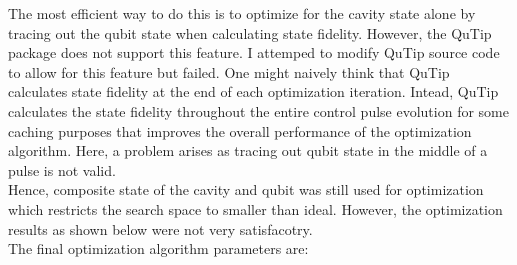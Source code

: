 \documentclass[12pt]{report}
\begin{document}
The most efficient way to do this is to optimize for the cavity state alone by tracing out the qubit state when calculating state fidelity. 
However, the QuTip package does not support this feature. I attemped to modify QuTip source code to allow for this feature but failed. 
One might naively think that QuTip calculates state fidelity at the end of each optimization iteration. 
Intead, QuTip calculates the state fidelity throughout the entire control pulse evolution for some caching purposes that improves the overall performance of the optimization algorithm. 
Here, a problem arises as tracing out qubit state in the middle of a pulse is not valid. 
\\
Hence, composite state of the cavity and qubit was still used for optimization which restricts the search space to smaller than ideal. 
However, the optimization results as shown below were not very satisfacotry. 
\\
The final optimization algorithm parameters are:
\\ 
\end{document}
